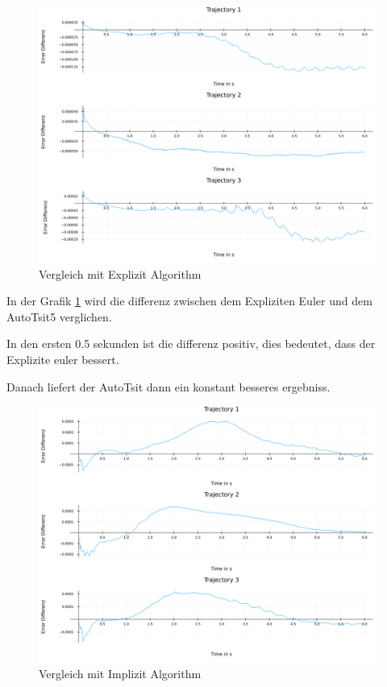 \begin{figure}[h]
    \centering
    \includegraphics[width=\textwidth]{Data/03_Ergebnisse/autoswitching/errors_explizit_composit.png}
    \caption{Vergleich mit Explizit Algorithm}
    \label{fig:vergleichexplizit}
\end{figure}

In der Grafik \ref{fig:vergleichexplizit} wird die differenz zwischen dem Expliziten Euler und dem AutoTsit5 verglichen.

In den ersten 0.5 sekunden ist die differenz positiv, dies bedeutet, dass
der Explizite euler bessert.

Danach liefert der AutoTsit dann ein konstant besseres ergebniss.




\begin{figure}[h]
    \centering
    \includegraphics[width=\textwidth]{Data/03_Ergebnisse/autoswitching/errors_implizit_composit.png}
    \caption{Vergleich mit Implizit Algorithm}
    \label{fig:vergleichimplizit}
\end{figure}

